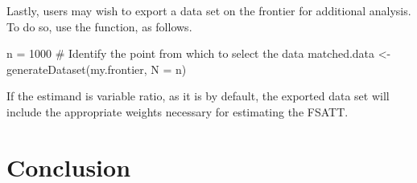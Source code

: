 \documentclass[nojss]{jss}
\begin{document}
Lastly, users may wish to export a data set on the frontier for 
additional analysis. To do so, use the  
function, as follows. 

\begin{CodeChunk}
\begin{CodeInput}
n = 1000 # Identify the point from which to select the data
matched.data <- generateDataset(my.frontier, N = n)
\end{CodeInput}
\end{CodeChunk}

If the estimand is variable ratio, as it is by default, the
exported data set will include the appropriate weights necessary
for estimating the FSATT.

\section[Conclusion]{Conclusion}


\end{document}
